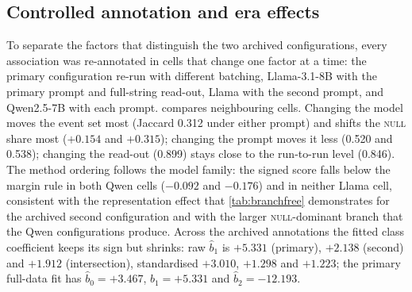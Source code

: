 \documentclass[11pt]{article}
\begin{document}
\subsection{Controlled annotation and era effects}
\label{app:controlled}
To separate the factors that distinguish the two archived configurations, every association was
re-annotated in cells that change one factor at a time: the primary configuration re-run with
different batching, Llama-3.1-8B with the primary prompt and full-string read-out, Llama with the
second prompt, and Qwen2.5-7B with each prompt.  compares neighbouring cells.
Changing the model moves the event set most (Jaccard 0.312 under either prompt) and shifts the
\textsc{null} share most ($+0.154$ and $+0.315$); changing the prompt moves it less (0.520 and
0.538); changing the read-out (0.899) stays close to the run-to-run level (0.846). The method ordering
follows the model family: the signed score falls below the margin rule in both Qwen cells ($-0.092$
and $-0.176$) and in neither Llama cell, consistent with the representation effect that
\cref{tab:branchfree} demonstrates for the archived second configuration and with the larger
\textsc{null}-dominant branch that the Qwen configurations produce. Across the archived annotations the fitted class coefficient
keeps its sign but shrinks: raw $\hat b_1$ is $+5.331$ (primary), $+2.138$ (second) and $+1.912$
(intersection), standardised $+3.010$, $+1.298$ and $+1.223$; the primary full-data fit has
$\hat b_0=+3.467$, $\hat b_1=+5.331$ and $\hat b_2=-12.193$.

\begin{table}[!t]\centering\scriptsize
\setlength{\tabcolsep}{2pt}
\caption{Controlled annotation, one factor per row. P1, P2: the primary and second
prompts (\cref{fig:prompt,fig:prompt2}); cells other than the re-run use full-string read-out. The
signed score falls below the margin rule in both Qwen cells ($-0.092$, $-0.176$) and in neither
Llama cell.}
\label{tab:controlled}
\end{table}
\end{document}
